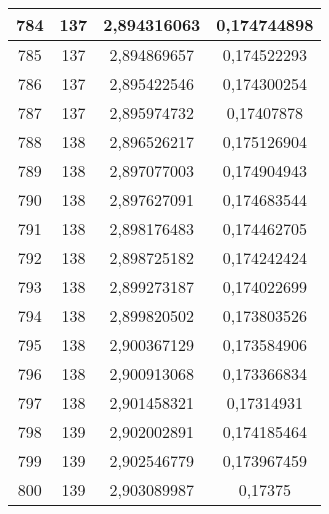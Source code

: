 {\begin{minipage}[!h]{0.45\textwidth}
\begin{longtable}{cccc}
784 & 137 & 2,894316063 & 0,174744898 \\ \hline
785 & 137 & 2,894869657 & 0,174522293 \\ \hline
786 & 137 & 2,895422546 & 0,174300254 \\ \hline
787 & 137 & 2,895974732 & 0,17407878 \\ \hline
788 & 138 & 2,896526217 & 0,175126904 \\ \hline
789 & 138 & 2,897077003 & 0,174904943 \\ \hline
790 & 138 & 2,897627091 & 0,174683544 \\ \hline
791 & 138 & 2,898176483 & 0,174462705 \\ \hline
792 & 138 & 2,898725182 & 0,174242424 \\ \hline
793 & 138 & 2,899273187 & 0,174022699 \\ \hline
794 & 138 & 2,899820502 & 0,173803526 \\ \hline
795 & 138 & 2,900367129 & 0,173584906 \\ \hline
796 & 138 & 2,900913068 & 0,173366834 \\ \hline
797 & 138 & 2,901458321 & 0,17314931 \\ \hline
798 & 139 & 2,902002891 & 0,174185464 \\ \hline
799 & 139 & 2,902546779 & 0,173967459 \\ \hline
800 & 139 & 2,903089987 & 0,17375 \\ \hline
\end{longtable}
\end{minipage}

}
